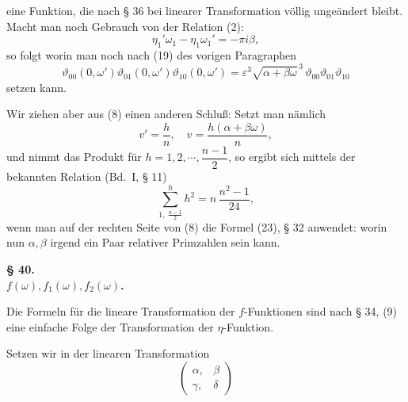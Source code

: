 eine Funktion, die nach § 36 bei linearer Transformation völlig ungeändert bleibt. Macht man noch Gebrauch von der Relation (2):
\[
\eta_1'\omega_1 - \eta_1\omega_1' = -\pi i \beta,
\]
so folgt
worin man noch nach (19) des vorigen Paragraphen
\[
\vartheta_{00}(0,\omega')\vartheta_{01}(0,\omega')\vartheta_{10}(0,\omega') = \varepsilon^3\sqrt{\alpha+\beta\omega}^{\,3}\,\vartheta_{00}\vartheta_{01}\vartheta_{10}
\]
setzen kann.

Wir ziehen aber aus (8) einen anderen Schluß: Setzt man nämlich
\[
v' = \frac{h}{n}, \quad v = \frac{h(\alpha+\beta\omega)}{n},
\]
und nimmt das Produkt für $h=1,2,\cdots,\dfrac{n-1}{2}$, so ergibt sich mittels der bekannten Relation (Bd.\ I, § 11)
\[
\sum_{1,\ \frac{n-1}{2}}^{h} h^2 = n\,\frac{n^2-1}{24},
\]
wenn man auf der rechten Seite von (8) die Formel (23), § 32 anwendet:
worin nun $\alpha, \beta$ irgend ein Paar relativer Primzahlen sein kann.

\begin{center}
\textbf{§ 40. \\
$f(\omega), f_1(\omega), f_2(\omega)$.}
\end{center}

Die Formeln für die lineare Transformation der $f$-Funktionen sind nach § 34, (9) eine einfache Folge der Transformation der $\eta$-Funktion.

Setzen wir in der linearen Transformation
\[
\begin{pmatrix}\alpha, & \beta\\ \gamma, & \delta\end{pmatrix}
\]

